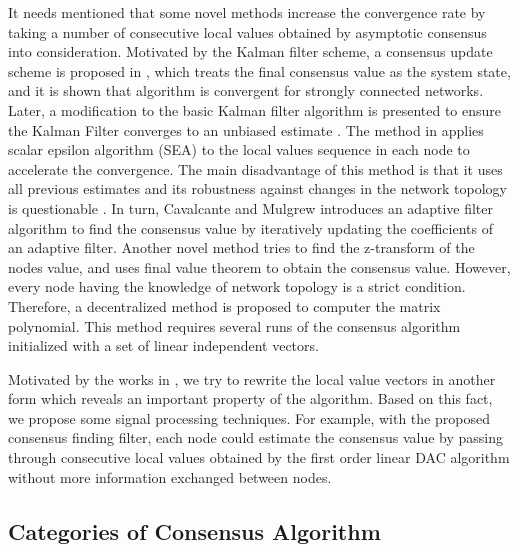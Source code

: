 It needs mentioned that some novel methods increase the convergence
rate by taking a number of consecutive local values obtained by asymptotic
consensus into consideration. Motivated by the Kalman filter scheme,
a consensus update scheme is proposed in \cite{Ren2005}, which treats
the final consensus value as the system state, and it is shown that
algorithm is convergent for strongly connected networks. Later, a
modification to the basic Kalman filter algorithm is presented to
ensure the Kalman Filter converges to an unbiased estimate \cite{Alighanbari2006}.
The method in \cite{Kokiopoulou2007} applies scalar epsilon algorithm
(SEA) to the local values sequence in each node to accelerate the
convergence. The main disadvantage of this method is that it uses
all previous estimates and its robustness against changes in the network
topology is questionable \cite{Cavalcante2010}. In turn, Cavalcante
and Mulgrew \cite{Cavalcante2010} introduces an adaptive filter algorithm
to find the consensus value by iteratively updating the coefficients
of an adaptive filter. Another novel method \cite{Sundaram2007} tries
to find the z-transform of the nodes value, and uses final value theorem
to obtain the consensus value. However, every node having the knowledge
of network topology is a strict condition. Therefore, a decentralized
method is proposed to computer the matrix polynomial. This method
requires several runs of the consensus algorithm initialized with
a set of linear independent vectors.

Motivated by the works in \cite{Kokiopoulou2007}, we try to rewrite
the local value vectors in another form which reveals an important
property of the algorithm. Based on this fact, we propose some signal
processing techniques. For example, with the proposed consensus finding
filter, each node could estimate the consensus value by passing through
consecutive local values obtained by the first order linear DAC algorithm
without more information exchanged between nodes.


\subsection{Categories of Consensus Algorithm}

